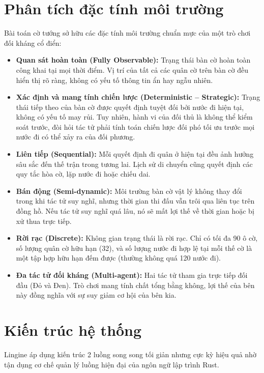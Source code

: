 \section{Phân tích đặc tính môi trường}

Bài toán cờ tướng sở hữu các đặc tính môi trường chuẩn mực của một trò chơi đối kháng cổ điển:

\begin{itemize}
    \item \textbf{Quan sát hoàn toàn (Fully Observable):} Trạng thái bàn cờ hoàn toàn công khai tại mọi thời điểm. Vị trí của tất cả các quân cờ trên bàn cờ đều hiển thị rõ ràng, không có yếu tố thông tin ẩn hay ngẫu nhiên.
    \item \textbf{Xác định và mang tính chiến lược (Deterministic -- Strategic):} Trạng thái tiếp theo của bàn cờ được quyết định tuyệt đối bởi nước đi hiện tại, không có yếu tố may rủi. Tuy nhiên, hành vi của đối thủ là không thể kiểm soát trước, đòi hỏi tác tử phải tính toán chiến lược đối phó tối ưu trước mọi nước đi có thể xảy ra của đối phương.
    \item \textbf{Liên tiếp (Sequential):} Mỗi quyết định đi quân ở hiện tại đều ảnh hưởng sâu sắc đến thế trận trong tương lai. Lịch sử di chuyển cũng quyết định các quy tắc hòa cờ, lặp nước đi hoặc chiếu dai.
    \item \textbf{Bán động (Semi-dynamic):} Môi trường bàn cờ vật lý không thay đổi trong khi tác tử suy nghĩ, nhưng thời gian thi đấu vẫn trôi qua liên tục trên đồng hồ. Nếu tác tử suy nghĩ quá lâu, nó sẽ mất lợi thế về thời gian hoặc bị xử thua trực tiếp.
    \item \textbf{Rời rạc (Discrete):} Không gian trạng thái là rời rạc. Chỉ có tối đa 90 ô cờ, số lượng quân cờ hữu hạn (32), và số lượng nước đi hợp lệ tại mỗi thế cờ là một tập hợp hữu hạn đếm được (thường không quá 120 nước đi).
    \item \textbf{Đa tác tử đối kháng (Multi-agent):} Hai tác tử tham gia trực tiếp đối đầu (Đỏ và Đen). Trò chơi mang tính chất tổng bằng không, lợi thế của bên này đồng nghĩa với sự suy giảm cơ hội của bên kia.
\end{itemize}

\section{Kiến trúc hệ thống}

Lingine áp dụng kiến trúc 2 luồng song song tối giản nhưng cực kỳ hiệu quả nhờ tận dụng cơ chế quản lý luồng hiện đại của ngôn ngữ lập trình Rust.

